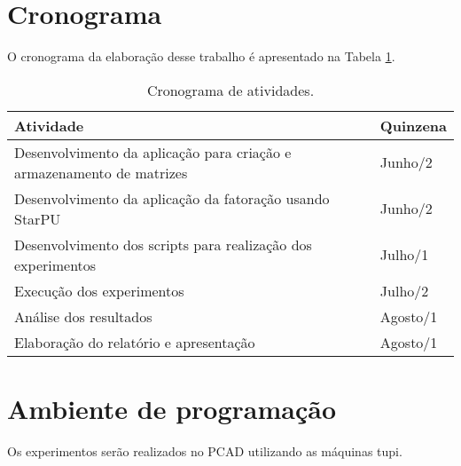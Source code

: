 \documentclass[11pt]{article}
\begin{document}
\section{Cronograma}
\label{sec:orgd6ca91e}

O cronograma da elaboração desse trabalho é apresentado na Tabela \ref{tab:orgbac04de}.

\begin{table}[htbp]
\caption{\label{tab:orgbac04de}Cronograma de atividades.}
\centering
\begin{tabular}{ll}
Atividade & Quinzena\\
\hline
Desenvolvimento da aplicação para criação e armazenamento de matrizes & Junho/2\\
Desenvolvimento da aplicação da fatoração usando StarPU & Junho/2\\
Desenvolvimento dos scripts para realização dos experimentos & Julho/1\\
Execução dos experimentos & Julho/2\\
Análise dos resultados & Agosto/1\\
Elaboração do relatório e apresentação & Agosto/1\\
\hline
\end{tabular}
\end{table}


\section{Ambiente de programação}
\label{sec:org411a596}

Os experimentos serão realizados no PCAD utilizando as máquinas tupi.
\end{document}
